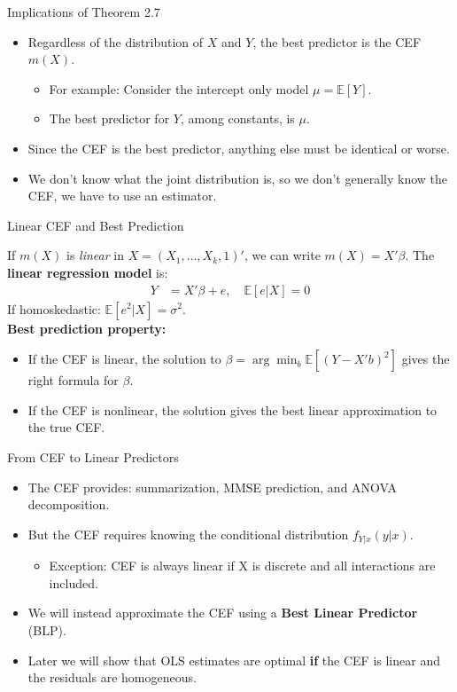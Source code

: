 \documentclass[aspectratio=169, handout, t]{beamer}
\numberwithin{equation}{section}
\begin{document}
\begin{frame}{Implications of Theorem 2.7}
\begin{itemize}
\item Regardless of the distribution of $X$ and $Y$, the best predictor is the CEF $m(X)$.
\begin{itemize}
\item For example: Consider the intercept only model $\mu=\mathbb{E}[Y]$.
\item The best predictor for $Y$, among constants, is $\mu$.
\end{itemize}
\item Since the CEF is the best predictor, anything else must be identical or worse.
\item We don't know what the joint distribution is, so we don't generally know the CEF, we have to use an estimator.
\end{itemize}
\end{frame}

\begin{frame}{Linear CEF and Best Prediction}

If $m(X)$ is \emph{linear} in $X=(X_1,\ldots,X_k,1)'$, we can write $m(X)=X'\beta$.  The \textbf{linear regression model} is:
\begin{align*}
Y&=X'\beta+e, \quad \mathbb{E}[e|X]=0
\end{align*}
If homoskedastic: $\mathbb{E}[e^2|X]=\sigma^2$.\\
\bigskip\pause
\textbf{Best prediction property:}
\begin{itemize}
\item If the CEF is linear, the solution to $\beta=\arg \min_b \mathbb{E}[(Y-X'b)^2]$ gives the right formula for $\beta$.
\item If the CEF is nonlinear, the solution gives the best linear approximation to the true CEF.
\end{itemize}
\end{frame}

\begin{frame}{From CEF to Linear Predictors}
\begin{itemize}
\item The CEF provides: summarization, MMSE prediction, and ANOVA decomposition.\pause
\item But the CEF requires knowing the conditional distribution $f_{Y|x}(y|x)$.
\begin{itemize}
\item Exception: CEF is always linear if X is discrete and all interactions are included.
\end{itemize}\pause
\item We will instead approximate the CEF using a \textbf{Best Linear Predictor} (BLP).
\item Later we will show that OLS estimates are optimal \textbf{if} the CEF is linear and the residuals are homogeneous.
\end{itemize}
\end{frame}
\end{document}
